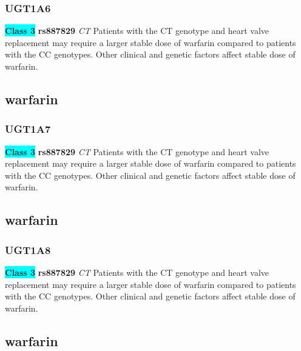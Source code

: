 \documentclass{book}
\begin{document}
\subsubsection{ UGT1A6 }

\begin{center}
\textbf{\colorbox{cyan} {Class 3}} \textbf{ rs887829 } \textit{ CT }
Patients with the CT genotype and heart valve replacement may require a larger stable dose of warfarin compared to patients with the CC genotypes. Other clinical and genetic factors affect stable dose of warfarin.


\end{center}\subsection{ warfarin }


\subsubsection{ UGT1A7 }

\begin{center}
\textbf{\colorbox{cyan} {Class 3}} \textbf{ rs887829 } \textit{ CT }
Patients with the CT genotype and heart valve replacement may require a larger stable dose of warfarin compared to patients with the CC genotypes. Other clinical and genetic factors affect stable dose of warfarin.


\end{center}\subsection{ warfarin }


\subsubsection{ UGT1A8 }

\begin{center}
\textbf{\colorbox{cyan} {Class 3}} \textbf{ rs887829 } \textit{ CT }
Patients with the CT genotype and heart valve replacement may require a larger stable dose of warfarin compared to patients with the CC genotypes. Other clinical and genetic factors affect stable dose of warfarin.


\end{center}\subsection{ warfarin }
\end{document}
